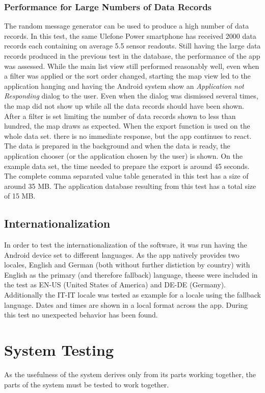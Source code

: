 \subsubsection{Performance for Large Numbers of Data Records}
The random message generator can be used to produce a high number of data records. In this test, the same Ulefone Power smartphone has received 2000 data records each containing on average 5.5 sensor readouts. Still having the large data records produced in the previous test in the database, the performance of the app was assessed. While the main list view still performed reasonably well, even when a filter was applied or the sort order changed, starting the map view led to the application hanging and having the Android system show an \emph{Application not Responding} dialog to the user. Even when the dialog was dismissed several times, the map did not show up while all the data records should have been shown. After a filter is set limiting the number of data records shown to less than hundred, the map draws as expected. When the export function is used on the whole data set. there is no immediate response, but the app continues to react. The data is prepared in the background and when the data is ready, the application chooser (or the application chosen by the user) is shown. On the example data set, the time needed to prepare the export is around 45 seconds. The complete comma separated value table generated in this test has a size of around 35 MB. The application database resulting from this test has a total size of 15 MB. 

\subsection{Internationalization}
In order to test the internationalization of the software, it was run having the Android device set to different languages. As the app natively provides two locales, English and German (both without further distiction by country) with English as the primary (and therefore fallback) language, theese were included in the test as EN-US (United States of America) and DE-DE (Germany). Additionally the IT-IT locale was tested as example for a locale using the fallback language. Dates and times are shown in a local format across the app. During this test no unexpected behavior has been found.

\section{System Testing}
As the usefulness of the system derives only from its parts working together, the parts of the system must be tested to work together.

